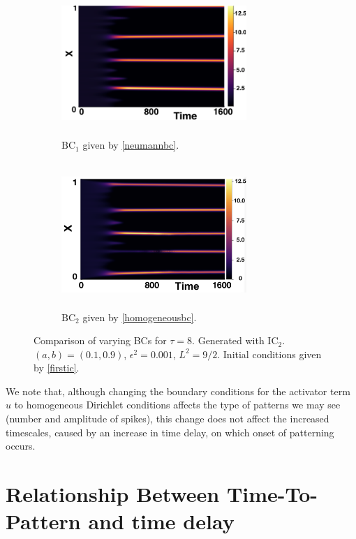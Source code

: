 \begin{figure}[H]
    \centering
    \begin{subfigure}[b]{0.45\textwidth}
        \centering
        \includegraphics[width=7cm,height=5.5cm]{ic28.png}
        \caption{$\text{BC}_1$ given by \eqref{neumannbc}.}
        \label{}
    \end{subfigure}
    \hfill
    \begin{subfigure}[b]{0.45\textwidth}
        \centering
        \includegraphics[width=7cm,height=5.5cm]{bc8.png}
        \caption{$\text{BC}_2$ given by \eqref{homogeneousbc}.}
        \label{}
    \end{subfigure}
    \caption{Comparison of varying BCs for $\tau=8$. Generated with $\text{IC}_2$. $(a,b)=(0.1,0.9)$, $\epsilon^2=0.001$, $L^2=9/2$. Initial conditions given by \eqref{firstic}.}
    \label{fig:bctau3}
\end{figure}

We note that, although changing the boundary conditions for the activator term $u$ to homogeneous Dirichlet conditions affects the type of patterns we may see (number and amplitude of spikes), this change does not affect the increased timescales, caused by an increase in time delay, on which onset of patterning occurs.

\section{Relationship Between Time-To-Pattern and time delay}\label{section:delaypatt}

